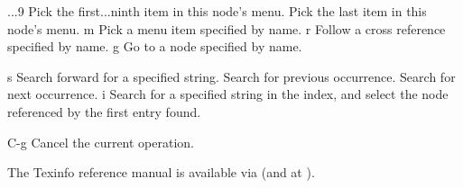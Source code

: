 ...9       Pick the first...ninth item in this node's menu.\cr
{}           Pick the last item in this node's menu.\cr
\infokey m           Pick a menu item specified by name.\cr
\infokey r           Follow a cross reference specified by name.\cr
\infokey g           Go to a node specified by name.\cr

\infokey s           Search forward for a specified string.\cr
\infokey \lbracechar{}           Search for previous occurrence.\cr
\infokey \rbracechar{}           Search for next occurrence.\cr
\infokey i           Search for a specified string in the index, and\cr
\infokey {}              select the node referenced by the first entry found.\cr

\infokey C-g         Cancel the current operation.\cr
\endinfokeys

The Texinfo reference manual is available via \hfil\break
(and at ).

\copyrightnotice
\bye
